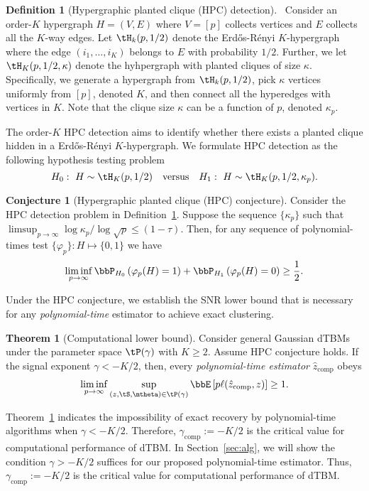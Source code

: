 \documentclass[lettersize,onecolumn,journal]{IEEEtran}
\theoremstyle{definition}
\newtheorem{thm}{Theorem}
\theoremstyle{definition}
\newtheorem{defn}{Definition}
\newtheorem{conjecture}{Conjecture}
\newcommand{\of}[1]{\left(#1\right)}
\begin{document}
\begin{defn}[Hypergraphic planted clique (HPC) detection]~\label{def:HPC} Consider an order-$K$ hypergraph $H = (V,E)$ where $V = [p]$ collects vertices and $E$ collects all the $K$-way edges. Let $\tH_k(p, 1/2)$ denote the Erd\H{o}s-R\'{e}nyi $K$-hypergraph where the edge $(i_1,\ldots, i_K)$ belongs to $E$ with probability $1/2$. Further, we let $\tH_K(p, 1/2, \kappa)$ denote the hyhpergraph with planted cliques of size $\kappa$. Specifically, we generate a hypergraph from $\tH_k(p, 1/2)$, pick $\kappa$ vertices uniformly from $[p]$, denoted $K$, and then connect all the hyperedges with vertices in $K$. Note that the clique size $\kappa$ can be a function of $p$, denoted $\kappa_p$. 

The order-$K$ HPC detection aims to identify whether there exists a planted clique hidden in a Erd\H{o}s-R\'{e}nyi $K$-hypergraph. We formulate HPC detection as the following hypothesis testing problem
\begin{equation}
    H_0:\ H \sim \tH_K(p,1/2) \quad \text{versus} \quad H_1: \ H \sim \tH_K(p,1/2, \kappa_p).
\end{equation}
\end{defn}

\begin{conjecture}[Hypergraphic planted clique (HPC) conjecture]\label{hypo:HPC} Consider the HPC detection problem in Definition~\ref{def:HPC}. Suppose the sequence $\{\kappa_p\}$ such that $\limsup_{p \rightarrow \infty} \log \kappa_p/ \log \sqrt{p} \leq (1 - \tau)$. Then, for any sequence of polynomial-times test $\{ \varphi_p\}: H \mapsto \{0,1\}$ we have 
\begin{equation}
    \liminf_{p \rightarrow \infty} \bbP_{H_0} \of{ \varphi_p(H) =1 } +  \bbP_{H_1} \of{ \varphi_p(H) =0} \geq \frac{1}{2}.
\end{equation}
\end{conjecture}

Under the HPC conjecture, we establish the SNR lower bound that is necessary for any \emph{polynomial-time} estimator to achieve exact clustering.

\begin{thm}[Computational lower bound]\label{thm:comp} Consider general Gaussian dTBMs under the parameter space $\tP(\gamma)$ with $K\geq 2$. Assume HPC conjecture holds. If the signal exponent $\gamma < -K/2$, then, every \emph{polynomial-time estimator} $\hat z_{\text{comp}}$ obeys
\begin{align}
   \liminf_{p\to \infty}\sup_{(z, \tS, \mtheta) \in \tP(\gamma)}  \bbE \left[ p\ell(\hat z_{\text{comp}}, z) \right]\geq 1.
\end{align}
\end{thm}
Theorem~\ref{thm:comp} indicates the impossibility of exact recovery by polynomial-time algorithms when $\gamma < -K/2$.  Therefore, $\gamma_{\text{comp}}:=-K/2$ is the critical value for computational performance of dTBM.  In Section~\ref{sec:alg}, we will show the condition $\gamma> -K/2$ suffices for our proposed polynomial-time estimator. Thus, $\gamma_{\text{comp}}:=-K/2$ is the critical value for computational performance of dTBM.  
\end{document}
